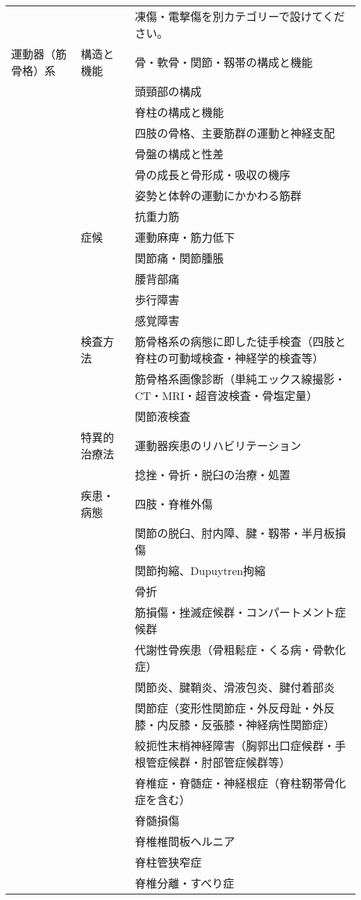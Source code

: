 \begin{xltabular}{\linewidth}{XXX}
 &  & 凍傷・電撃傷を別カテゴリーで設けてください。 \\
運動器（筋骨格）系 & 構造と機能 & 骨・軟骨・関節・靱帯の構成と機能 \\
 &  & 頭頸部の構成 \\
 &  & 脊柱の構成と機能 \\
 &  & 四肢の骨格、主要筋群の運動と神経支配 \\
 &  & 骨盤の構成と性差 \\
 &  & 骨の成長と骨形成・吸収の機序 \\
 &  & 姿勢と体幹の運動にかかわる筋群 \\
 &  & 抗重力筋 \\
 & 症候 & 運動麻痺・筋力低下 \\
 &  & 関節痛・関節腫脹 \\
 &  & 腰背部痛 \\
 &  & 歩行障害 \\
 &  & 感覚障害 \\
 & 検査方法 & 筋骨格系の病態に即した徒手検査（四肢と脊柱の可動域検査・神経学的検査等） \\
 &  & 筋骨格系画像診断（単純エックス線撮影・CT・MRI・超音波検査・骨塩定量） \\
 &  & 関節液検査 \\
 & 特異的治療法 & 運動器疾患のリハビリテーション \\
 &  & 捻挫・骨折・脱臼の治療・処置 \\
 & 疾患・病態 & 四肢・脊椎外傷 \\
 &  & 関節の脱臼、肘内障、腱・靱帯・半月板損傷 \\
 &  & 関節拘縮、Dupuytren拘縮 \\
 &  & 骨折 \\
 &  & 筋損傷・挫滅症候群・コンパートメント症候群 \\
 &  & 代謝性骨疾患（骨粗鬆症・くる病・骨軟化症） \\
 &  & 関節炎、腱鞘炎、滑液包炎、腱付着部炎 \\
 &  & 関節症（変形性関節症・外反母趾・外反膝・内反膝・反張膝・神経病性関節症） \\
 &  & 絞扼性末梢神経障害（胸郭出口症候群・手根管症候群・肘部管症候群等） \\
 &  & 脊椎症・脊髄症・神経根症（脊柱靭帯骨化症を含む） \\
 &  & 脊髄損傷 \\
 &  & 脊椎椎間板ヘルニア \\
 &  & 脊柱管狭窄症 \\
 &  & 脊椎分離・すべり症 \\

\end{xltabular}
